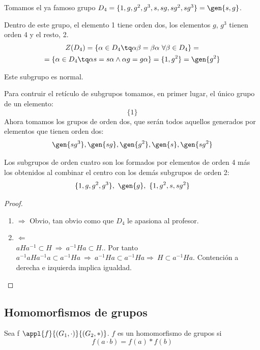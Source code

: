 \documentclass[a4paper,10pt]{apuntes}
\begin{document}
 \begin{example}
  Tomamos el ya famoso grupo $D_{4}=\{1,g,g^{2},g^{3}, s, sg, sg^{2}, sg^{3}\}=\gen{s,g}$.
  
  Dentro de este grupo, el elemento 1 tiene orden dos, los elementos $g$, $g^{3}$  tienen orden 4 y el resto, 2.
  \begin{gather*}
  Z(D_{4})= \{\alpha\in D_{4} \tq \alpha\beta=\beta\alpha \ \forall \beta \in D_{4}\}= \\
  = \{\alpha\in D_{4}\tq \alpha s = s\alpha \wedge \alpha g = g\alpha\}=\{1, g^{2}\}=\gen{g^{2}}
  \end{gather*} 
  
  Este subgrupo es normal.
  
  Para contruir el retículo de subgrupos tomamos, en primer lugar, el único grupo de un elemento: 
  \[ \{1\} \]
  Ahora tomamos los grupos de orden dos, que serán todos aquellos generados por elementos que tienen orden dos:\\
  \[ \gen{sg^{3}}, \gen{sg}, \gen{g^{2}}, \gen{s}, \gen{sg^{2}} \]
  
  Los subgrupos de orden cuatro son los formados por elementos de orden 4 más los obtenidos al combinar el centro con los demás subgrupos de orden 2:
  \[ \{1,g,g^{2},g^{3}\}, \ \gen{g}, \ \{1, g^{2}, s, sg^{2}\} \]
 \end{example}
 

 \begin{proof}
 \begin{enumerate}
  \item $\Rightarrow$  Obvio, tan obvio como que $D_4$ le apasiona al profesor.
  \item $\Leftarrow$\\
  $aHa^{-1} \subset H \ \Rightarrow \ a^{-1}Ha\subset H.$. Por tanto $a^{-1}aHa^{-1}a \subset a^{-1}Ha \ \Rightarrow \ a^{-1}Ha \subset  a^{-1}Ha \Rightarrow \ H \subset a^{-1}Ha$.
  Contención a derecha e izquierda implica igualdad.
 \end{enumerate}
 \end{proof} 
 
 \subsection{Homomorfismos de grupos}
 \begin{defn}[Homomorfismo]
 Sea f $\appl{f}{(G_1, \cdot )}{(G_2, \ast )}$. $f$ es un homomorfismo de grupos si 
 \[ f(a\cdot b) = f(a)\ast f(b) \]
\end{defn}
 
\end{document}
